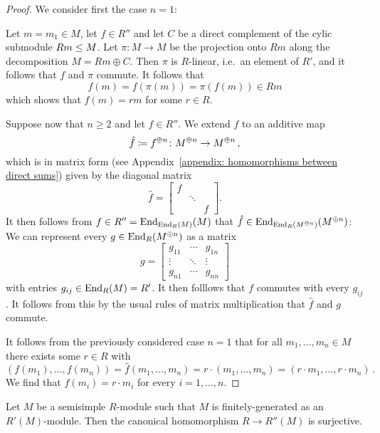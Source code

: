 \begin{proof}
  We consider first the case $n = 1$:
  
  Let $m = m_1 \in M$, let $f \in R''$ and let $C$ be a direct complement of the cylic submodule $Rm \leq M$.
  Let $\pi \colon M \to M$ be the projection onto $Rm$ along the decomposition $M = Rm \oplus C$.
  Then $\pi$ is $R$-linear, i.e.\ an element of $R'$, and it follows that $f$ and $\pi$ commute.
  It follows that
  \[
        f(m)
    =   f(\pi(m))
    =   \pi(f(m))
    \in Rm
  \]
  which shows that $f(m) = rm$ for some $r \in R$.
  
  Suppose now that $n \geq 2$ and let $f \in R''$.
  We extend $f$ to an additive map
  \[
              \hat{f}
    \coloneqq  f^{\oplus n}
    \colon    M^{\oplus n}
    \to       M^{\oplus n} \,,
  \]
  which is in matrix form (see Appendix~\ref{appendix: homomorphisms between direct sums}) given by the diagonal matrix
  \[
      \hat{f}
    = \begin{bmatrix}
        f &         &   \\  
          & \ddots  &   \\
          &         & f
      \end{bmatrix}.
  \]
  It then follows from $f \in R'' = \operatorname{End}_{\operatorname{End}_R(M)}(M)$ that $\hat{f} \in \operatorname{End}_{\operatorname{End}_R(M^{\oplus n})}(M^{\oplus n})$:
  We can represent every $g \in \operatorname{End}_R(M^{\oplus n})$ as a matrix
  \[
      g
    = \begin{bmatrix}
        g_{11}  & \cdots  & g_{1n}  \\
        \vdots  & \ddots  & \vdots  \\
        g_{n1}  & \cdots  & g_{nn}
      \end{bmatrix}
  \]
  with entries $g_{ij} \in \operatorname{End}_R(M) = R'$.
  It then folllows that $f$ commutes with every $g_{ij}$.
  It follows from this by the usual rules of matrix multiplication that $\hat{f}$ and $g$ commute.
  
  It follows from the previously considered case $n = 1$ that for all $m_1, \dotsc, m_n \in M$ there exists some $r \in R$ with
  \[
      (f(m_1), \dotsc, f(m_n))
    = \hat{f}(m_1, \dotsc, m_n)
    = r \cdot (m_1, \dotsc, m_n)
    = (r \cdot m_1, \dotsc, r \cdot m_n) \,.
  \]
  We find that $f(m_i) = r \cdot m_i$ for every $i = 1, \dotsc, n$.
\end{proof}


\begin{corollary}
  \label{corollary: balanced if finitely generated}
  Let $M$ be a semisimple $R$-module such that $M$ is finitely-generated as an $R'(M)$-module.
  Then the canonical homomorphism $R \to R''(M)$ is surjective.
\end{corollary}


